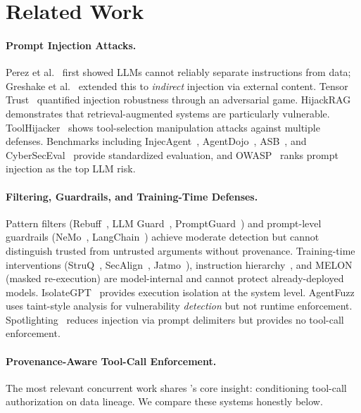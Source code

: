 \section{Related Work}
\label{sec:related}

\paragraph{Prompt Injection Attacks.}
Perez et al.~\cite{perez2022ignore} first showed LLMs cannot reliably separate instructions from data; Greshake et al.~\cite{greshake2023not} extended this to \emph{indirect} injection via external content. Tensor Trust~\cite{tensortrust2024} quantified injection robustness through an adversarial game. HijackRAG~\cite{hijackrag2025} demonstrates that retrieval-augmented systems are particularly vulnerable. ToolHijacker~\cite{toolhijacker2026} shows tool-selection manipulation attacks against multiple defenses. Benchmarks including InjecAgent~\cite{injecagent2024}, AgentDojo~\cite{agentdojo2024}, ASB~\cite{asb2025}, and CyberSecEval~\cite{cyberseceval2024} provide standardized evaluation, and OWASP~\cite{owasp-llm2025} ranks prompt injection as the top LLM risk.

\paragraph{Filtering, Guardrails, and Training-Time Defenses.}
Pattern filters (Rebuff~\cite{rebuff-defense}, LLM Guard~\cite{llm-guard}, PromptGuard~\cite{prompt-guard}) and prompt-level guardrails (NeMo~\cite{nemo-guardrails}, LangChain~\cite{langchain-guardrails}) achieve moderate detection but cannot distinguish trusted from untrusted arguments without provenance. Training-time interventions (StruQ~\cite{struq2024}, SecAlign~\cite{secalign2024}, Jatmo~\cite{jatmo2024}), instruction hierarchy~\cite{instruction-hierarchy2024}, and MELON~\cite{melon2025} (masked re-execution) are model-internal and cannot protect already-deployed models. IsolateGPT~\cite{isolategpt2025} provides execution isolation at the system level. AgentFuzz~\cite{agentfuzz2025} uses taint-style analysis for vulnerability \emph{detection} but not runtime enforcement. Spotlighting~\cite{spotlighting2024} reduces injection via prompt delimiters but provides no tool-call enforcement.

\paragraph{Provenance-Aware Tool-Call Enforcement.}
The most relevant concurrent work shares \sys{}'s core insight: conditioning tool-call authorization on data lineage. We compare these systems honestly below.

